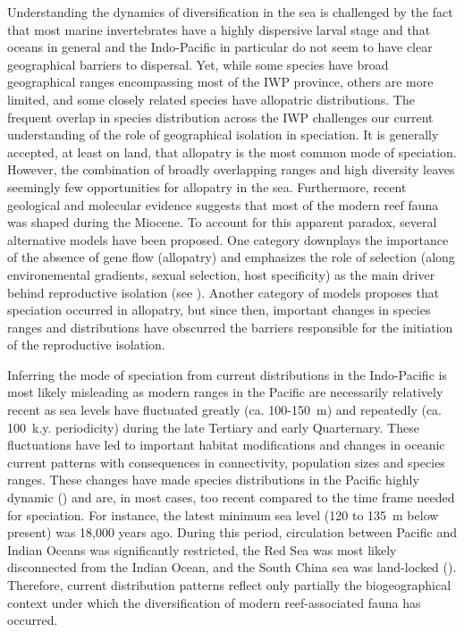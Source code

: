 \documentclass{article}
\begin{document}
Understanding the dynamics of diversification in the sea is challenged by the
fact that most marine invertebrates have a highly dispersive larval stage and
that oceans in general and the Indo-Pacific in particular do not seem to have
clear geographical barriers to dispersal. Yet, while some species have broad
geographical ranges encompassing most of the IWP province, others are more
limited, and some closely related species have allopatric distributions. The
frequent overlap in species distribution across the IWP challenges our current
understanding of the role of geographical isolation in speciation. It is
generally accepted, at least on land, that allopatry is the most common mode of
speciation. However, the combination of broadly overlapping ranges and high
diversity leaves seemingly few opportunities for allopatry in the
sea. Furthermore, recent geological and molecular evidence suggests that most of
the modern reef fauna was shaped during the Miocene. To account for this
apparent paradox, several alternative models have been proposed. One category
downplays the importance of the absence of gene flow (allopatry) and emphasizes
the role of selection (along environemental gradients, sexual selection, host
specificity) as the main driver behind reproductive isolation (see
\cite{Bowen2013}). Another category of models proposes that speciation occurred
in allopatry, but since then, important changes in species ranges and
distributions have obscurred the barriers responsible for the initiation of the
reproductive isolation.

Inferring the mode of speciation from current distributions in the Indo-Pacific
is most likely misleading as modern ranges in the Pacific are necessarily
relatively recent as sea levels have fluctuated greatly (ca. 100-150~m) and
repeatedly (ca. 100~k.y. periodicity) during the late Tertiary and early
Quarternary. These fluctuations have led to important habitat modifications and
changes in oceanic current patterns with consequences in connectivity,
population sizes and species ranges. These changes have made species
distributions in the Pacific highly dynamic (\cite{Paulay1990}) and are, in most
cases, too recent compared to the time frame needed for speciation. 
For instance, the latest minimum sea level (120 to 135~m below present) was
18,000 years ago. During this period, circulation between Pacific and Indian
Oceans was significantly restricted, the Red Sea was most likely disconnected
from the Indian Ocean, and the South China sea was land-locked
(\cite{Veron1992}). Therefore, current distribution patterns reflect only
partially the biogeographical context under which the diversification of modern
reef-associated fauna has occurred.
\end{document}
